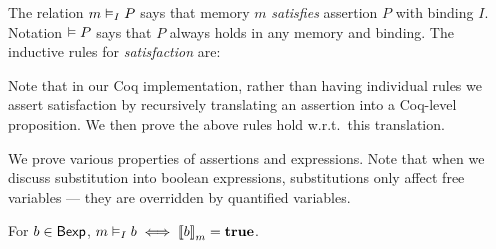The relation $\AVAL m|I|-P$
says that memory $m$ \emph{satisfies} assertion $P$
with binding $I$.
Notation $\vDash P$ says that $P$ always holds
in any memory and binding.
The inductive rules for \emph{satisfaction} are:
%

Note that in our Coq implementation,
rather than having individual rules
we assert satisfaction
by recursively translating an assertion
into a Coq-level proposition.
%
We then prove the above rules hold
w.r.t.\ this translation.

We prove various properties of assertions and expressions.
Note that when we discuss substitution into boolean expressions,
substitutions only affect free variables ---
they are overridden by quantified variables.

\begin{lemma}
For $b \in \mathsf{Bexp}$,
$\AVALmi b \iff \Eval(b,m) = \True$.
\end{lemma}

